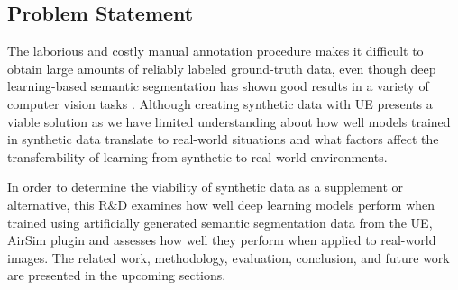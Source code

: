 \documentclass[../report.tex]{subfiles}
\begin{document}

    \subsection{Problem Statement}
    \label{sec:introduction:problem_statement}




    

    The laborious and costly manual annotation procedure makes it difficult to obtain large amounts of reliably labeled ground-truth data, even though deep learning-based semantic segmentation has shown good results in a variety of computer vision tasks \cite{cordts2016cityscapes}. Although creating synthetic data with UE presents a viable solution as we have limited understanding about how well models trained in synthetic data translate to real-world situations and what factors affect the transferability of learning from synthetic to real-world environments.  

    In order to determine the viability of synthetic data as a supplement or alternative, this R\&D examines how well deep learning models perform when trained using artificially generated semantic segmentation data from the UE, AirSim plugin and assesses how well they perform when applied to real-world images. The related work, methodology, evaluation, conclusion, and future work are presented in the upcoming sections.   
\end{document}
